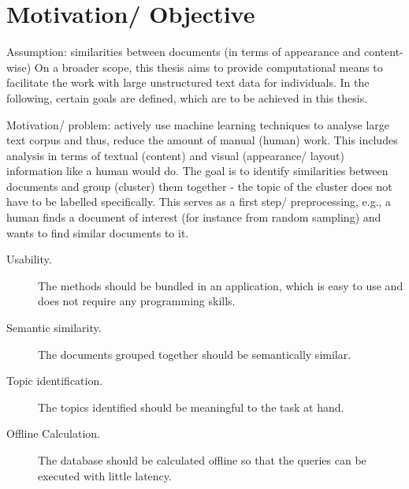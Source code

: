 \section{Motivation/ Objective}\label{sec:motivation}

Assumption: similarities between documents (in terms of appearance and content-wise)
On a broader scope, this thesis aims to provide computational means to facilitate the work with large unstructured text data for individuals.
In the following, certain goals are defined, which are to be achieved in this thesis.

Motivation/ problem: actively use machine learning techniques to analyse large text corpus and thus, reduce the amount of manual (human) work.
This includes analysis in terms of textual (content) and visual (appearance/ layout) information like a human would do.
The goal is to identify similarities between documents and group (cluster) them together - the topic of the cluster does not have to be labelled specifically.
This serves as a first step/ preprocessing, e.g., a human finds a document of interest (for instance from random sampling) and wants to find similar documents to it.


\begin{description}
    \item[Usability.]
    The methods should be bundled in an application, which is easy to use and does not require any programming skills.
    \item[Semantic similarity.]
    The documents grouped together should be semantically similar.
    \item[Topic identification.]
    The topics identified should be meaningful to the task at hand.  
    \item[Offline Calculation.]
    The database should be calculated offline so that the queries can be executed with little latency.
\end{description}
